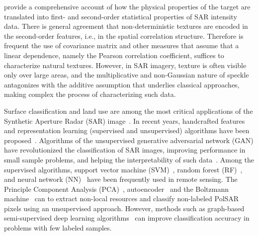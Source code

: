 \cite{Yue2020Gaussian} provide a comprehensive account of how the physical properties of the target are translated into first- and second-order statistical properties of SAR intensity data.
There is general agreement that non-deterministic textures are encoded in the second-order features, i.e., in the spatial correlation structure.
Therefore is frequent the use of covariance matrix and other measures that assume that a linear dependence, namely the Pearson correlation coefficient, suffices to characterize natural textures.
However, in SAR imagery, texture is often visible only over large areas, and the multiplicative and non-Gaussian nature of speckle antagonizes with the additive assumption that underlies classical approaches, making complex the process of characterizing such data.

Surface classification and land use are among the most critical applications of the Synthetic Aperture Radar (SAR) image~\cite{Pottier2004Unsupervised}.
In recent years, handcrafted features and representation learning (supervised and unsupervised) algorithms have been proposed~\cite{han2020unsupervised, huang2020classification, xie2020polsar}.
Algorithms of the unsupervised generative adversarial network (GAN) have revolutionized the classification of SAR images, improving performance in small sample problems, and helping the interpretability of such data~\cite{liu2019task}.
Among the supervised algorithms, support vector machine (SVM)~\cite{sukawattanavijit2017ga}, random forest (RF)~\cite{mcnairn2014early}, and neural network (NN)~\cite{lin2017deep} have been frequently used in remote sensing.
The Principle Component Analysis (PCA)~\cite{ressel2015neural}, autoencoder~\cite{wang2019classification} and the Boltzmann machine~\cite{qin2017object} can to extract non-local resources and classify non-labeled PolSAR pixels using an unsupervised approach.
However, methods such as graph-based semi-supervised deep learning algorithms~\citep{bi2018graph} can improve classification accuracy in problems with few labeled samples.

